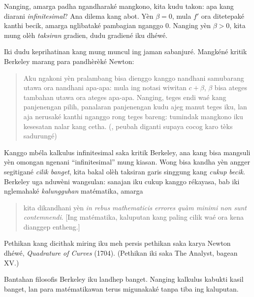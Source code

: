\documentclass[../../../include/open-logic-section]{subfiles}
\begin{document}
Nanging, amarga padha ngandharaké mangkono,
kita kudu takon: apa kang diarani
\emph{infinitesimal}? Ana dilema kang abot.
Yèn $\beta = 0$, mula $f'$ ora
ditetepaké kanthi becik, amarga
nglibataké pambagian nganggo $0$.
Nanging yèn $\beta > 0$, kita mung
olèh \emph{taksiran} gradien, dudu
gradiené iku dhéwé.

Iki dudu keprihatinan kang mung muncul
ing jaman sabanjuré. Mangkéné kritik
Berkeley marang para pandhèrèké Newton:
\begin{quote}
Aku ngakoni yèn pralambang bisa dienggo kanggo nandhani
samubarang utawa ora nandhani apa-apa: mula ing notasi
wiwitan $c + \beta$, $\beta$ bisa ateges tambahan
utawa ora ateges apa-apa. Nanging, teges endi waé
kang panjenengan pilih, panalaran panjenengan kudu
ajeg manut teges iku, lan aja nerusaké kanthi
nganggo rong teges bareng: tumindak mangkono
iku kesesatan nalar kang cetha.
(\citealt[\S{}XV]{Berkeley1734},
peubah diganti supaya cocog karo tèks sadurungé)
\end{quote}
Kanggo mbéla kalkulus infinitesimal saka kritik
Berkeley, ana kang bisa mangsuli yèn omongan
ngenani ``infinitesimal'' mung kiasan. Wong bisa
kandha yèn angger segitigané \emph{cilik banget},
kita bakal olèh taksiran garis singgung kang
\emph{cukup becik}. Berkeley uga nduwèni
wangsulan: sanajan iku cukup kanggo rékayasa,
bab iki nglemahaké \emph{kalungguhan}
matématika, amarga
\begin{quote}
kita dikandhani yèn \emph{in rebus mathematicis errores qu\`{a}m minimi
non sunt contemnendi}. [Ing matématika,
kaluputan kang paling cilik waé ora kena
dianggep entheng.] \citep[\S{}IX]{Berkeley1734}
\end{quote}
Pethikan kang dicithak miring iku meh persis
pethikan saka karya Newton dhéwé,
\emph{Quadrature of Curves} (1704).
(Pethikan iki saka The Analyst, bagean XV.)

Bantahan filosofis Berkeley iku landhep banget.
Nanging kalkulus kabukti kasil banget, lan
para matématikawan terus migunakaké
tanpa tiba ing kaluputan.
\end{document}
